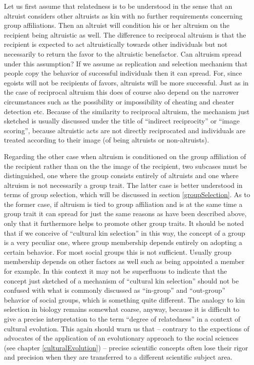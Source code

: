 Let us first assume that relatedness is to be understood in the sense that an
altruist considers other altruists as kin with no further requirements
concerning group affiliations. Then an altruist will condition his or her
altruism on the recipient being altruistic as well. The difference to
reciprocal altruism is that the recipient is expected to act altruistically
towards other individuals but not necessarily to return the favor to the
altruistic benefactor. Can altruism spread under this assumption? If we assume
as replication and selection mechanism that people copy the behavior of
successful individuals then it can spread. For, since egoists will not be
recipients of favors, altruists will be more successful. Just as in the case
of reciprocal altruism this does of course also depend on the narrower
circumstances such as the possibility or impossibility of cheating and cheater
detection etc. Because of the similarity to reciprocal altruism, the mechanism
just sketched is usually discussed under the title of ``indirect reciprocity''
or ``image scoring'', because altruistic acts are not directly reciprocated
and individuals are treated according to their image (of being altruists or
non-altruists).

Regarding the other case when altruism is conditioned on the group affiliation
of the recipient rather than on the the image of the recipient, two subcases
must be distinguished, one where the group consists entirely of altruists and
one where altruism is not necessarily a group trait. The latter case is better
understood in terms of group selection, which will be discussed in section
\ref{groupSelection}. As to the former case, if altruism is tied to group
affiliation and is at the same time a group trait it can spread for just the
same reasons as have been described above, only that it furthermore helps to
promote other group traits. It should be noted that if we conceive of
``cultural kin selection'' in this way, the concept of a group is a very
peculiar one, where group membership depends entirely on adopting a certain
behavior. For most social groups this is not sufficient. Usually group
membership depends on other factors as well such as being appointed a member
for example. In this context it may not be superfluous to indicate that the
concept just sketched of a mechanism of ``cultural kin selection'' should not
be confused with what is commonly discussed as ``in-group'' and ``out-group''
behavior of social groups, which is something quite different. The analogy to
kin selection in biology remains somewhat coarse, anyway, because it is
difficult to give a precise interpretation to the term ``degree of
relatedness'' in a context of cultural evolution. This again should warn us
that -- contrary to the expections of advocates of the application of an
evolutionary approach to the social sciences (see chapter
\ref{culturalEvolution}) -- precise scientific concepts often lose their
rigor and precision when they are transferred to a different scientific
subject area.

